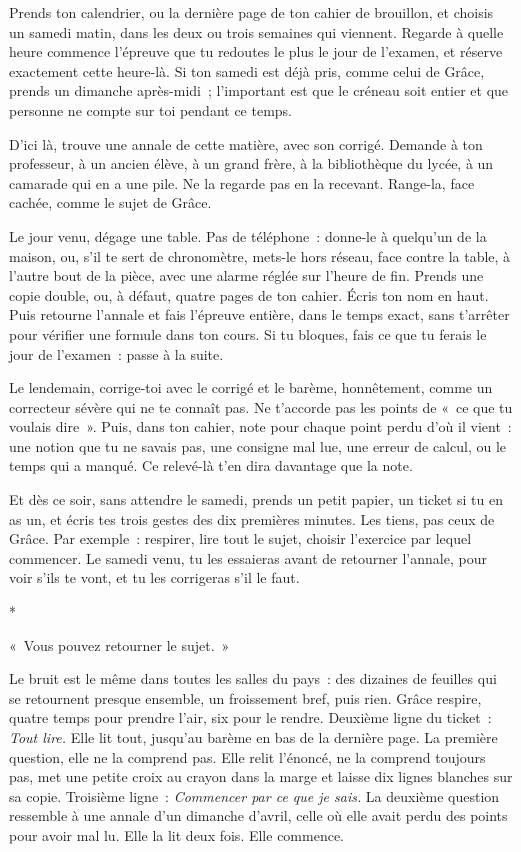\documentclass[10.5pt,twoside,openright]{book}
\newcommand{\asterisme}{\par\vspace{0.7em}\centerline{\color{gris}*\quad*\quad*}\vspace{0.7em}\par\noindent}
\newcommand{\soustitre}[1]{\par\vspace{1.1em}\noindent{\bfseries\color{accent}#1}\par\vspace{0.4em}\noindent}
\begin{document}
\soustitre{Ce soir, essaie ceci}

Prends ton calendrier, ou la dernière page de ton cahier de brouillon, et choisis un samedi matin, dans les deux ou trois semaines qui viennent. Regarde à quelle heure commence l’épreuve que tu redoutes le plus le jour de l’examen, et réserve exactement cette heure-là. Si ton samedi est déjà pris, comme celui de Grâce, prends un dimanche après-midi ; l’important est que le créneau soit entier et que personne ne compte sur toi pendant ce temps.

D’ici là, trouve une annale de cette matière, avec son corrigé. Demande à ton professeur, à un ancien élève, à un grand frère, à la bibliothèque du lycée, à un camarade qui en a une pile. Ne la regarde pas en la recevant. Range-la, face cachée, comme le sujet de Grâce.

Le jour venu, dégage une table. Pas de téléphone : donne-le à quelqu’un de la maison, ou, s’il te sert de chronomètre, mets-le hors réseau, face contre la table, à l’autre bout de la pièce, avec une alarme réglée sur l’heure de fin. Prends une copie double, ou, à défaut, quatre pages de ton cahier. Écris ton nom en haut. Puis retourne l’annale et fais l’épreuve entière, dans le temps exact, sans t’arrêter pour vérifier une formule dans ton cours. Si tu bloques, fais ce que tu ferais le jour de l’examen : passe à la suite.

Le lendemain, corrige-toi avec le corrigé et le barème, honnêtement, comme un correcteur sévère qui ne te connaît pas. Ne t’accorde pas les points de « ce que tu voulais dire ». Puis, dans ton cahier, note pour chaque point perdu d’où il vient : une notion que tu ne savais pas, une consigne mal lue, une erreur de calcul, ou le temps qui a manqué. Ce relevé-là t’en dira davantage que la note.

Et dès ce soir, sans attendre le samedi, prends un petit papier, un ticket si tu en as un, et écris tes trois gestes des dix premières minutes. Les tiens, pas ceux de Grâce. Par exemple : respirer, lire tout le sujet, choisir l’exercice par lequel commencer. Le samedi venu, tu les essaieras avant de retourner l’annale, pour voir s’ils te vont, et tu les corrigeras s’il le faut.

\asterisme

« Vous pouvez retourner le sujet. »

Le bruit est le même dans toutes les salles du pays : des dizaines de feuilles qui se retournent presque ensemble, un froissement bref, puis rien. Grâce respire, quatre temps pour prendre l’air, six pour le rendre. Deuxième ligne du ticket : \emph{Tout lire.} Elle lit tout, jusqu’au barème en bas de la dernière page. La première question, elle ne la comprend pas. Elle relit l’énoncé, ne la comprend toujours pas, met une petite croix au crayon dans la marge et laisse dix lignes blanches sur sa copie. Troisième ligne : \emph{Commencer par ce que je sais.} La deuxième question ressemble à une annale d’un dimanche d’avril, celle où elle avait perdu des points pour avoir mal lu. Elle la lit deux fois. Elle commence.
\end{document}
